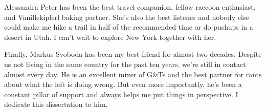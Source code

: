 Alessandra Peter has been the best travel companion, fellow raccoon enthusiast, and Vanillekipferl baking partner. She's also the best listener and nobody else could make me hike a trail in half of the recommended time or do pushups in a desert in Utah. I can't wait to explore New York together with her.

Finally, Markus Svoboda has been my best friend for almost two decades. Despite us not living in the same country for the past ten years, we're still in contact almost every day. He is an excellent mixer of G\&Ts and the best partner for rants about what the left is doing wrong. But even more importantly, he's been a constant pillar of support and always helps me put things in perspective. I dedicate this dissertation to him.
